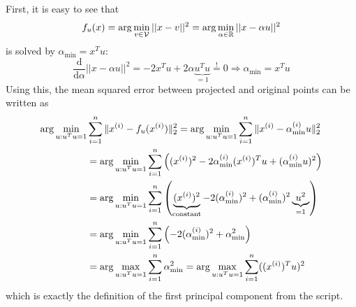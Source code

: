 \begin{answer}
First, it is easy to see that
\[
f_u(x) = \arg \min_{v\in {\cal V}} ||x-v||^2 = \arg \min_{\alpha\in {\mathbb{R}}} ||x-\alpha u||^2
\]
is solved by $\alpha_{\text{min}}= x^Tu $:
\[
\frac{\mathrm{d}}{\mathrm{d}\alpha} ||x-\alpha u||^2 = -2x^Tu + 2\alpha \underbrace{u^Tu}_{=1} \overset{!}{=}0
\Rightarrow \alpha_{\text{min}} = x^T u
 \]
Using this, the mean squared error between projected and original points can be written as
\begin{align*}
    \arg \min_{u:u^Tu=1} &\sum_{i=1}^{n} \|x^{(i)}-f_u(x^{(i)})\|_2^2 
    = \arg \min_{u:u^Tu=1} \sum_{i=1}^{n} \|x^{(i)}-\alpha_{\text{min}}^{(i)}u\|_2^2  \\
    &= \arg \min_{u:u^Tu=1} \sum_{i=1}^{n} \left((x^{(i)})^2- 2\alpha_{\text{min}}^{(i)} (x^{(i)})^T u + (\alpha_{\text{min}}^{(i)}u)^2\right) \\
    &= \arg \min_{u:u^Tu=1} \sum_{i=1}^{n} \left(\underbrace{(x^{(i)})^2}_{\text{constant}}- 2(\alpha_{\text{min}}^{(i)})^2 + (\alpha_{\text{min}}^{(i)})^2\underbrace{u^2}_{=1}\right) \\
    &= \arg \min_{u:u^Tu=1} \sum_{i=1}^{n} \left(- 2(\alpha_{\text{min}}^{(i)})^2 + \alpha_{\text{min}}^2\right) \\
    &= \arg \max_{u:u^Tu=1} \sum_{i=1}^{n} \alpha_{\text{min}}^2 = \arg \max_{u:u^Tu=1} \sum_{i=1}^{n} ((x^{(i)})^T u)^2
\end{align*}
which is exactly the definition of the first principal component from the script.
\end{answer}
